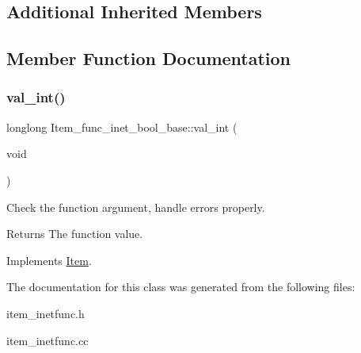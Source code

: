 \subsection*{Additional Inherited Members}


\subsection{Member Function Documentation}
\mbox{\label{classItem__func__inet__bool__base_ab9463dc99cb79fab4fc2f777c57d8ac5}} 
\subsubsection{\texorpdfstring{val\+\_\+int()}{val\_int()}}
{\footnotesize\ttfamily longlong Item\+\_\+func\+\_\+inet\+\_\+bool\+\_\+base\+::val\+\_\+int (\begin{DoxyParamCaption}\item[{void}]{ }\end{DoxyParamCaption})\hspace{0.3cm}{\ttfamily [virtual]}}

Check the function argument, handle errors properly.

\begin{DoxyReturn}{Returns}
The function value. 
\end{DoxyReturn}


Implements \mbox{\hyperlink{classItem}{Item}}.



The documentation for this class was generated from the following files\+:\begin{DoxyCompactItemize}
\item 
item\+\_\+inetfunc.\+h\item 
item\+\_\+inetfunc.\+cc\end{DoxyCompactItemize}

